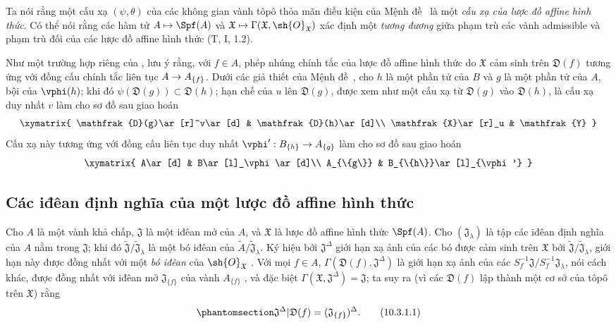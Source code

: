 \documentclass[oneside]{amsart}
\makeatletter
\newcommand{\ega@arrow}[2]{\mathchoice{#1}{#2}{#2}{#2}}
\let\ega@shortmapsto\mapsto
\renewcommand{\to}{\ega@arrow{\longrightarrow}{\rightarrow}}
\renewcommand{\mapsto}{\ega@arrow{\longmapsto}{\ega@shortmapsto}}
\let\EGAOriginalLabel\label
\renewcommand{\label}[1]{\phantomsection\EGAOriginalLabel{#1}}
\makeatother
\begin{document}
Ta nói rằng một cấu xạ $(\psi,\theta)$ của các không gian vành tôpô thỏa mãn điều kiện của Mệnh đề~ là một \emph{cấu xạ của lược đồ affine hình thức}. Có thể nói rằng các hàm tử $A\mapsto\Spf(A)$ và $\mathfrak{X}\mapsto\Gamma(\mathfrak{X},\sh{O}_\mathfrak{X})$ xác định một \emph{tương đương} giữa phạm trù các vành admissible và phạm trù đối của các lược đồ affine hình thức (T, I, 1.2).

\begin{env}[10.2.3]
\label{I.10.2.3}
Như một trường hợp riêng của , lưu ý rằng, với $f\in A$, phép nhúng chính tắc của lược đồ affine hình thức do $\mathfrak{X}$ cảm sinh trên $\mathfrak{D}(f)$ tương ứng với đồng cấu chính tắc liên tục $A\to A_{\{f\}}$.
Dưới các giả thiết của Mệnh đề~, cho $h$ là một phần tử của $B$ và $g$ là một phần tử của $A$, bội của $\vphi(h)$;
khi đó $\psi(\mathfrak{D}(g))\subset\mathfrak{D}(h)$; hạn chế của $u$ lên $\mathfrak{D}(g)$, được xem như một cấu xạ từ $\mathfrak{D}(g)$ vào $\mathfrak{D}(h)$, là cấu xạ duy nhất $v$ làm cho sơ đồ sau giao hoán
\[
  \xymatrix{
    \mathfrak{D}(g)\ar[r]^v\ar[d] &
    \mathfrak{D}(h)\ar[d]\\
    \mathfrak{X}\ar[r]_u &
    \mathfrak{Y}
  }
\]
Cấu xạ này tương ứng với đồng cấu liên tục duy nhất $\vphi':B_{\{h\}}\to A_{\{g\}}$  làm cho sơ đồ sau giao hoán
\[
  \xymatrix{
    A\ar[d] &
    B\ar[l]_\vphi\ar[d]\\
    A_{\{g\}} &
    B_{\{h\}}\ar[l]_{\vphi'}
  }
\]
\end{env}

\subsection{Các iđêan định nghĩa của một lược đồ affine hình thức}
\label{subsection:I.10.3}

\begin{env}[10.3.1]
\label{I.10.3.1}
Cho $A$ là một vành khả chấp, $\mathfrak{J}$ là một iđêan mở của $A$, và $\mathfrak{X}$ là lược đồ affine hình thức $\Spf(A)$.
Cho $(\mathfrak{J}_\lambda)$ là tập các iđêan định nghĩa của $A$ nằm trong $\mathfrak{J}$; khi đó $\widetilde{\mathfrak{J}}/\widetilde{\mathfrak{J}}_\lambda$ là một bó iđêan của $\widetilde{A}/\widetilde{\mathfrak{J}}_\lambda$.
Ký hiệu bởi $\mathfrak{J}^\Delta$ giới hạn xạ ảnh của các bó được cảm sinh trên $\mathfrak{X}$ bởi $\widetilde{\mathfrak{J}}/\widetilde{\mathfrak{J}}_\lambda$, giới hạn này được đồng nhất với một \emph{bó iđêan} của $\sh{O}_\mathfrak{X}$ .
Với mọi $f\in A$, $\Gamma(\mathfrak{D}(f),\mathfrak{J}^\Delta)$ là giới hạn xạ ảnh của các $S_f^{-1}\mathfrak{J}/S_f^{-1}\mathfrak{J}_\lambda$, nói cách khác, được đồng nhất với iđêan mở $\mathfrak{J}_{\{f\}}$ của vành $A_{\{f\}}$ , và đặc biệt $\Gamma(\mathfrak{X},\mathfrak{J}^\Delta)=\mathfrak{J}$; ta suy ra (vì các $\mathfrak{D}(f)$ lập thành một cơ sở của tôpô trên $\mathfrak{X}$) rằng
\[
\label{I.10.3.1.1}
  \mathfrak{J}^\Delta|\mathfrak{D}(f)=(\mathfrak{J}_{\{f\}})^\Delta.
  \tag{10.3.1.1}
\]
\end{env}
\end{document}
